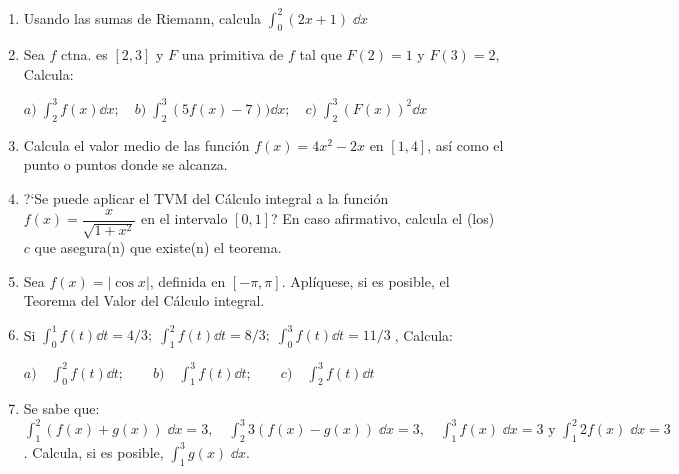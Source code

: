 \begin{enumerate}

\item Usando las sumas de Riemann, calcula $\displaystyle \int_0^2 (2x+1)\; \dd x$	

\rightline{\textcolor{gris}{Sol:$6$ }}

\item Sea $f$ ctna. es $[2,3]$ y $F$ una primitiva de $f$ tal que $F(2)=1$ y $F(3)=2$, Calcula:

$a)\; \displaystyle \int_2^3 f(x)\dd x;\quad b)\; \int_2^3 (5f(x)-7))\dd x; \quad c)\; \int_2^3 (F(x))^2 \dd x $

\rightline{\textcolor{gris}{Sol: $a)\; 1; \quad b)\; -2; \quad c)\; 7/3 $}}

\item Calcula el valor medio de las función $f(x)=4x^2-2x$ en $[1,4]$, así como el punto o puntos donde se alcanza.

\rightline{\textcolor{gris}{Sol:$\; <\; f \; >=69; \quad c\approx 2.66 $ }}

\item  ?`Se puede aplicar el TVM del Cálculo integral a la función $f(x)=\dfrac {x}{\sqrt{1+x^2}}$ en el intervalo $[0,1]$? En caso afirmativo, calcula el (los)  $c$ que asegura(n) que existe(n) el teorema.

\item Sea $f(x)=|\cos x|$, definida en $[-\pi,\pi]$. Aplíquese, si es posible, el Teorema del Valor del Cálculo integral.

\rightline{\textcolor{gris}{Sol: $c=\arccos(2/\pi)$}}

	

\item Si $\displaystyle \int_0^1 f(t)\dd t=4/3; \; \int_1^2 f(t)\dd t=8/3; \;\int_0^3 f(t)\dd t=11/3\; $, Calcula:

$a)\quad \displaystyle \int_0^2 f(t)\dd t; \qquad b) \quad \int_1^3 f(t)\dd t; \qquad c) \quad \int_2^3 f(t)\dd t$

\rightline{\textcolor{gris}{Sol:$a)\; 4; \quad b)\; 7/3; \quad c) \; -1/3$ }}

\item Se sabe que: $\displaystyle \int_1^2 \left( f(x)+g(x) \right)\; \dd x=3, \quad \int_2^3 3\left( f(x)-g(x) \right)\; \dd x=3, \quad \int_1^3 f(x)\; \dd x=3 \text { y } \int_1^2 2f(x)\; \dd x=3$. Calcula, si es posible, $\displaystyle \int_1^3
g(x)\; \dd x$.


\end{enumerate}
